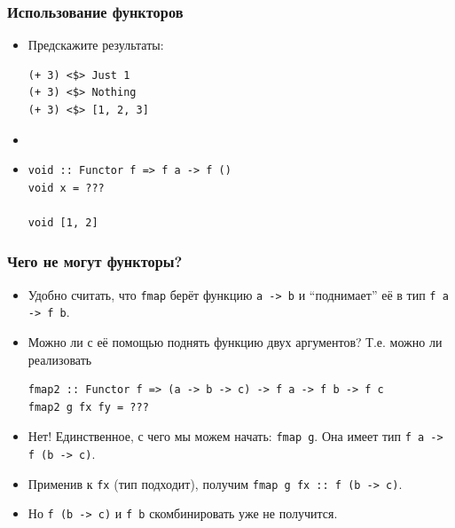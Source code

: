 \documentclass[11pt]{beamer}
\begin{document}
\begin{frame}[fragile]
\frametitle{Использование функторов}
\begin{itemize}
    \item Предскажите результаты:
\begin{lstlisting}
(+ 3) <$> Just 1
(+ 3) <$> Nothing
(+ 3) <$> [1, 2, 3]
\end{lstlisting}
\pause \item[] \item
\begin{lstlisting}
void :: Functor f => f a -> f ()
void x = ???

void [1, 2]
\end{lstlisting}

\end{itemize}
\end{frame}

\begin{frame}[fragile]
\frametitle{Чего не могут функторы?}
\begin{itemize}
    \item Удобно считать, что \lstinline|fmap| берёт функцию \lstinline|a -> b| и \enquote{поднимает} её в тип \lstinline|f a -> f b|.
    \item Можно ли с её помощью поднять функцию двух аргументов? Т.е. можно ли реализовать
\begin{lstlisting}
fmap2 :: Functor f => (a -> b -> c) -> f a -> f b -> f c
fmap2 g fx fy = ???
\end{lstlisting}
\pause
\item Нет! Единственное, с чего мы можем начать: \pause \lstinline|fmap g|. Она имеет тип \pause \lstinline|f a -> f (b -> c)|. 
\item Применив к \lstinline|fx| (тип подходит), получим 
\lstinline|fmap g fx :: f (b -> c)|. \pause
\item Но \lstinline|f (b -> c)| и  \lstinline|f b| скомбинировать уже не получится.
\end{itemize}
\end{frame}
\end{document}
